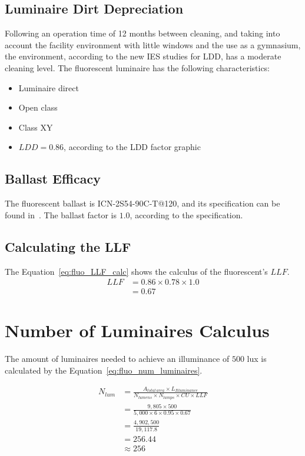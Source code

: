 \subsection{Luminaire Dirt Depreciation}
Following an operation time of 12 months between cleaning, and taking into account the facility environment with little windows and the use as a gymnasium, the environment, according to the new IES studies for LDD, has a moderate cleaning level. The fluorescent luminaire has the following characteristics:
\begin{itemize}
\item Luminaire direct
\item Open class
\item Class XY
\item $LDD = 0.86$, according to the LDD factor graphic
\end{itemize}

\subsection{Ballast Efficacy}
The fluorescent ballast is ICN-2S54-90C-T@120, and its specification can be found in~\cite{www:fluo_ballast}. The ballast factor is $1.0$, according to the specification.

\subsection{Calculating the LLF}
The Equation~\ref{eq:fluo_LLF_calc} shows the calculus of the fluorescent's $LLF$.
\begin{equation}
\begin{split}
LLF &= 0.86 \times 0.78 \times 1.0 \\
    &= 0.67
\end{split}
\label{eq:fluo_LLF_calc}
\end{equation}

\section{Number of Luminaires Calculus}
The amount of luminaires needed to achieve an illuminance of $500$ lux is calculated by the Equation~\ref{eq:fluo_num_luminaires}.

\begin{equation}
\begin{split}
N_{lum} & = \frac{A_{total\,area} \times L_{Illuminance}}
                {N_{lumens} \times N_{lamps} \times CU \times LLF} \\
 & = \frac{9,805 \times 500}
          {5,000 \times 6 \times 0.95 \times 0.67} \\
 & = \frac{4,902,500}
          {19,117.8} \\
 & = 256.44 \\
 & \approx 256
\end{split}
\label{eq:fluo_num_luminaires}
\end{equation}

